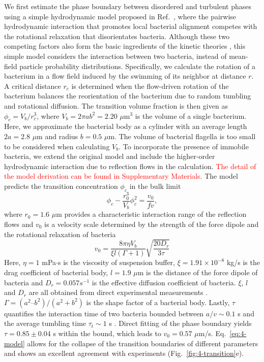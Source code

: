 We first estimate the phase boundary between disordered and turbulent phases using a simple hydrodynamic model proposed in Ref.~\cite{Drescher2011}, where the pairwise hydrodynamic interaction that promotes local bacterial alignment competes with the rotational relaxation that disorientates bacteria. Although these
two competing factors also form the basic ingredients of the kinetic theories \cite{Koch2011, Saintillan2015}, this simple model considers the interaction between two bacteria, instead of mean-field particle probability distributions. Specifically, we calculate the rotation of a bacterium in a flow field induced by the swimming of its neighbor at distance $r$. A critical distance $r_c$ is determined when the flow-driven rotation of the bacterium balances the reorientation of the bacterium due to random tumbling and rotational diffusion. The transition volume fraction is then given as $\phi_c=V_b/r_c^3$, where $V_b = 2\pi ab^2 = 2.20$ $\mu$m$^3$ is the volume of a single bacterium. Here, we approximate the bacterial body as a cylinder with an average length $2a = 2.8$ $\mu$m and
radius $b = 0.5$ $\mu$m. The volume of bacterial flagella is too small to be considered when calculating $V_b$. To incorporate the presence of immobile bacteria, we extend the original model and include the higher-order hydrodynamic interaction due to reflection flows in the calculation. \textcolor{red}{The detail of the model derivation can be found in Supplementary Materials.} The model predicts the transition concentration $\phi_c$ in the bulk limit
\begin{equation}
  \label{eq:4-model}
  \phi_c-\frac{r_0^3}{V_b}\phi_c^2 = \frac{v_0}{fv},
\end{equation}
where $r_0 = 1.6$ $\mu$m provides a characteristic interaction range of the reflection flows and $v_0$ is a velocity scale determined by the strength of the force dipole and the rotational relaxation of bacteria
$$
v_0 = \frac{8\pi\eta V_b}{\xi l (\Gamma+1)}\sqrt{\frac{20D_r}{3\tau}}
$$
Here, $\eta = 1$ mPa$\cdot$s is the viscosity of suspension buffer, $\xi = 1.91 \times 10^{-8}$ kg/s is the drag coefficient of bacterial body, $l = 1.9$ $\mu$m is the distance of the force dipole of bacteria and $D_r = 0.057 s^{-1}$ is the effective diffusion coefficient of bacteria. $\xi$, $l$ and $D_r$ are all obtained from direct experimental measurements \cite{Drescher2011}. $\Gamma = (a^2–b^2)/(a^2+b^2)$ is the shape factor of a bacterial body.
Lastly, $\tau$ quantifies the interaction time of two bacteria bounded between $a/v \sim 0.1$ s and the average tumbling time $\tau_t \sim 1$ s \cite{Berg2004}. Direct fitting of the phase boundary yields $\tau = 0.85 \pm 0.04$ s within the bound, which leads to $v_0 = 0.57$ $\mu$m/s. Eq.~\ref{eq:4-model} allows for the collapse of the transition boundaries of different parameters and shows an excellent agreement with experiments (Fig.~\ref{fig:4-transition}e).
